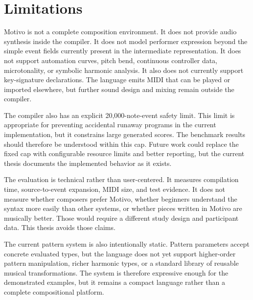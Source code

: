 \section{Limitations}\label{sec:limitations}

Motivo is not a complete composition environment.
It does not provide audio synthesis inside the compiler.
It does not model performer expression beyond the simple event fields currently present in the intermediate
representation.
It does not support automation curves, pitch bend, continuous controller data, microtonality, or symbolic harmonic
analysis.
It also does not currently support key-signature declarations.
The language emits MIDI that can be played or imported elsewhere, but further sound design and mixing remain outside
the compiler.

The compiler also has an explicit 20,000-note-event safety limit.
This limit is appropriate for preventing accidental runaway programs in the current implementation, but it constrains
large generated scores.
The benchmark results should therefore be understood within this cap.
Future work could replace the fixed cap with configurable resource limits and better reporting, but the current thesis
documents the implemented behavior as it exists.

The evaluation is technical rather than user-centered.
It measures compilation time, source-to-event expansion, MIDI size, and test evidence.
It does not measure whether composers prefer Motivo, whether beginners understand the syntax more easily than other
systems, or whether pieces written in Motivo are musically better.
Those would require a different study design and participant data.
This thesis avoids those claims.

The current pattern system is also intentionally static. Pattern parameters accept concrete evaluated types,
but the language does not yet support higher-order pattern manipulation, richer harmonic types, or a standard
library of reusable musical transformations. The system is therefore expressive enough for the demonstrated
examples, but it remains a compact language rather than a complete compositional platform.
